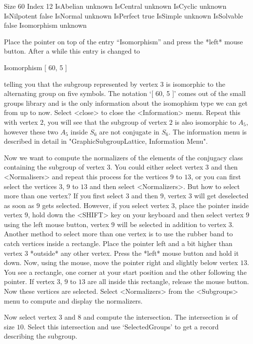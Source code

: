 \begintt
Size            60
Index           12
IsAbelian       unknown
IsCentral       unknown
IsCyclic        unknown
IsNilpotent     false
IsNormal        unknown
IsPerfect       true
IsSimple        unknown
IsSolvable      false
Isomorphism     unknown
\endtt

Place the pointer on top of the entry  ``Isomorphism'' and press the *left*
mouse button.  After a while this entry is changed to

\begintt
Isomorphism     [ 60, 5 ]
\endtt

telling you that the subgroup represented by vertex $3$ is isomorphic to
the alternating group on five symbols.  The notation `[ 60, 5 ]' comes out
of the small groups library and is the only information about the
isomophism type we can get from {} up to now. Select <close> to close
the <Information> menu.  Repeat this with vertex $2$, you will see that the
subgroup of vertex $2$ is also isomorphic to $A_5$, however these two $A_5$
inside $S_6$ are not conjugate in $S_6$.  The information menu is described
in detail in "GraphicSubgroupLattice, Information Menu".

Now we want to compute the  normalizers of the  elements of the conjugacy
class containing the  subgroup of vertex  $3$.   You could either  select
vertex  $3$ and  then  <Normalisers>  and repeat   this process for   the
vertices $9$ to $13$, or you can first select the vertices $3$, $9$ to $13$
and  then select <Normalizers>.  But how  to select more than one vertex?
If you first select $3$ and  then $9$, vertex $3$  will get deselected as
soon as $9$ gets selected.  However, if you  select vertex $3$, place the
pointer inside vertex $9$, hold down the <SHIFT> key on your keyboard and
then select vertex $9$ using  the left mouse button,  vertex $9$ will  be
selected in addition to  vertex $3$.  Another  method to select more than
one  vertex is  to  use  the  rubber   band  to catch vertices  inside  a
rectangle.  Place  the pointer  left and  a  bit  higher than  vertex $3$
*outside*  any other vertex.   Press the *left*  mouse button and hold it
down.  Now, using  the mouse, move the  pointer right and slightly  below
vertex $13$.  You  see a rectangle, one corner  at your start position and
the other   following the pointer.   If  vertex $3$,  $9$ to $13$  are all
inside this rectangle, release the mouse  button.  Now these vertices are
selected.  Select <Normalizers> from the  <Subgroups> menu to compute and
display the normalizers.

Now select vertex $3$ and $8$ and compute the intersection.  The
intersection is of size $10$.  Select this intersection and use
`SelectedGroups' to get a {\GAP} record describing the subgroup.

